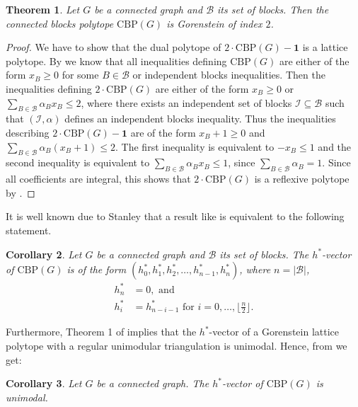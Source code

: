 \documentclass[12pt]{amsart}
\newtheorem{theorem}{Theorem}[section]
\newtheorem{corollary}[theorem]{Corollary}
\newcommand{\CBP}{\mathrm{CBP}}
\newcommand{\I}{\mathcal{I}}
\newcommand{\B}{\mathcal{B}}
\begin{document}
\begin{theorem}
    \label{gorenstein}
    Let $G$ be a connected graph and $\B$ its set of blocks. Then the connected blocks polytope $\CBP(G)$ is Gorenstein of index $2$.
\end{theorem}

\begin{proof}
    We have to show that the dual polytope of $2 \cdot \CBP(G)- \mathbf{1}$ is a lattice polytope. By  we know that all inequalities defining $\CBP(G)$ are either of the form $x_B \ge 0$ for some $B \in \B$ or independent blocks inequalities. Then the inequalities defining $2 \cdot \CBP(G)$ are either of the form $x_B \ge 0$ or $\sum_{B \in \B}\alpha_Bx_B \le 2$, where there exists an independent set of blocks $\I \subseteq \B$ such that $(\I,\alpha)$ defines an independent blocks inequality. Thus the inequalities describing $2 \cdot \CBP(G)-\mathbf{1}$ are of the form $x_B+1 \ge 0$ and $\sum_{B \in \B}\alpha_B(x_B+1) \le 2$.
    The first inequality is equivalent to $-x_B \le 1$ and the second inequality is equivalent to $\sum_{B \in \B}\alpha_Bx_B \le 1$, since $\sum_{B \in \B} \alpha_B=1$. Since all coefficients are integral, this shows that $2 \cdot \CBP(G)$ is a reflexive polytope by \cite[Theorem 2.11]{Ziegler}.
\end{proof}

It is well known due to Stanley that a result like  is equivalent to the following statement.

\begin{corollary}
    Let $G$ be a connected graph and $\B$ its set of blocks. The $h^\ast$-vector of $\CBP(G)$ is of the form $(h_0^\ast,h_1^\ast,h_2^\ast,\ldots,h_{n-1}^\ast,h_n^\ast)$, where $n=\vert \B \vert$,
    \begin{align*}
        h_n^\ast&=0, \text{ and} \\
        h^*_i&=h^\ast_{n-i-1} \text{ for } i=0,\ldots,\lfloor \frac{n}{2}\rfloor.
    \end{align*}
\end{corollary}

Furthermore, Theorem 1 of \cite{BR} implies that the $h^\ast$-vector of a Gorenstein lattice polytope with a regular unimodular triangulation is unimodal. Hence, from  we get:

\begin{corollary}
    Let $G$ be a connected graph. The $h^\ast$-vector of $\CBP(G)$ is unimodal.
\end{corollary}
\end{document}
